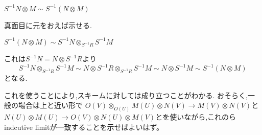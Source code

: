 \begin{lem}
$S^{-1}N \otimes M \sim S^{-1}(N \otimes M)$
\end{lem}
真面目に元をおえば示せる.


\begin{lem}
$S^{-1}(N \otimes M) \sim S^{-1}N \otimes_{S^{-1}R} S^{-1}M$
\end{lem}
これは$S^{-1}N = N \otimes S^{-1}R$より
\begin{equation*}
  S^{-1}N \otimes_{S^{-1}R} S^{-1}M \sim N \otimes S^{-1}R \otimes_{S^{-1}R} S^{-1}M \sim N \otimes S^{-1}M \sim  S^{-1}(N \otimes M)
\end{equation*}
となる.

これを使うことにより,スキームに対しては成り立つことがわかる.
おそらく,一般の場合は上と近い形で
$O(V) \otimes_{O(U)} M(U) \otimes N(V) \to M(V) \otimes N(V)$と
$N(U) \otimes M(U) \to O(V) \otimes N(U) \otimes M(V)$とを使いながら,これのらindcutive limitが一致することを示せばよいはず。
